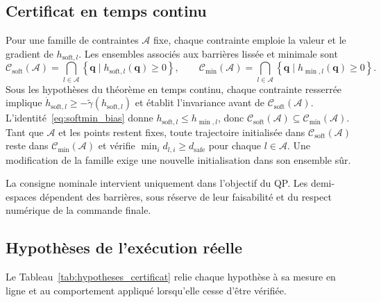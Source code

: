 \subsection{Certificat en temps continu}
Pour une famille de contraintes $\mathcal{A}$ fixe, chaque contrainte emploie la valeur et le gradient de $h_{\mathrm{soft},l}$. Les ensembles associés aux barrières lissée et minimale sont
\begin{equation}\label{eq:safe_sets_soft_min}
\mathcal{C}_{\mathrm{soft}}(\mathcal{A})
=\bigcap_{l\in\mathcal{A}}\left\{\mathbf{q}\mid h_{\mathrm{soft},l}(\mathbf{q})\geq0\right\},
\qquad
\mathcal{C}_{\min}(\mathcal{A})
=\bigcap_{l\in\mathcal{A}}\left\{\mathbf{q}\mid h_{\min,l}(\mathbf{q})\geq0\right\}.
\end{equation}
Sous les hypothèses du théorème en temps continu, chaque contrainte resserrée implique $\dot h_{\mathrm{soft},l}\geq-\widetilde{\gamma}(h_{\mathrm{soft},l})$ et établit l'invariance avant de $\mathcal{C}_{\mathrm{soft}}(\mathcal{A})$. L'identité~\eqref{eq:softmin_bias} donne $h_{\mathrm{soft},l}\leq h_{\min,l}$, donc $\mathcal{C}_{\mathrm{soft}}(\mathcal{A})\subseteq\mathcal{C}_{\min}(\mathcal{A})$. Tant que $\mathcal{A}$ et les points restent fixes, toute trajectoire initialisée dans $\mathcal{C}_{\mathrm{soft}}(\mathcal{A})$ reste dans $\mathcal{C}_{\min}(\mathcal{A})$ et vérifie $\min_i d_{l,i}\geq d_{\mathrm{safe}}$ pour chaque $l\in\mathcal{A}$. Une modification de la famille exige une nouvelle initialisation dans son ensemble sûr.

La consigne nominale intervient uniquement dans l'objectif du QP. Les demi-espaces dépendent des barrières, sous réserve de leur faisabilité et du respect numérique de la commande finale.

\subsection{Hypothèses de l'exécution réelle}
Le Tableau~\ref{tab:hypotheses_certificat} relie chaque hypothèse à sa mesure en ligne et au comportement appliqué lorsqu'elle cesse d'être vérifiée.

